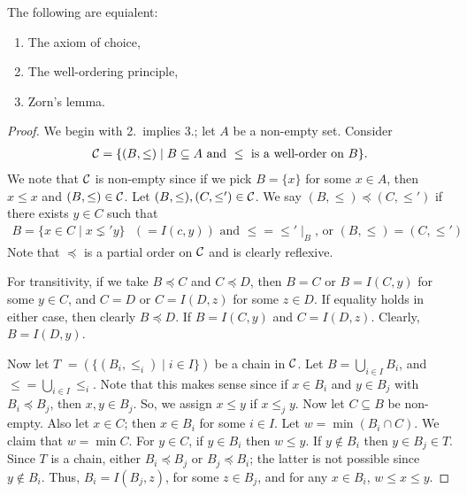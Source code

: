 \begin{theorem}
    The following are equialent:
    \begin{enumerate}
        \item The axiom of choice,
        \item The well-ordering principle,
        \item Zorn's lemma.
    \end{enumerate}
\end{theorem}

\begin{proof}
    We begin with 2.~implies 3.; let $A$ be a non-empty set. Consider 
    \begin{align}
        \mathcal{C} = \{(B,\leq) \mid B \subseteq A \text{ and }\leq \text{ is a well-order on } B\}.
    \end{align}
    We note that $\mathcal{C}$ is non-empty since if we pick $B = \{x\}$ for some $x \in A$, then $x \leq x$ and $(B,\leq) \in \mathcal{C}$. Let $(B,\leq), (C,\leq') \in \mathcal{C}$. We say $(B, \leq) \preceq (C,\leq')$ if there exists $y \in C$ such that 
    \begin{align}
        \text{$B = \{x \in C \mid x \lneq' y\}$ $(=I(c,y))$ and $\leq = \leq'\mid_{B}$, or $(B,\leq) = (C,\leq')$}
    \end{align}
    Note that $\preceq$ is a partial order on $\mathcal{C}$ and is clearly reflexive.
    
    For transitivity, if we take $B \preceq C$ and $C \preceq D$, then $B = C$ or $B = I(C,y)$ for some $y \in C$, and $C = D$ or $C = I(D,z)$ for some $z \in D$. If equality holds in either case, then clearly $B \preceq D$. If $B = I(C,y)$ and $C = I(D,z)$. Clearly, $B = I(D,y)$.
    
    Now let $T$ $=(\{(B_{i},\leq_{i}) \mid i \in I\})$ be a chain in $\mathcal{C}$. Let $B = \bigcup_{i \in I} B_{i}$, and $\leq = \bigcup_{i \in I} \leq_{i}$. Note that this makes sense since if $x \in B_{i}$ and $y \in B_{j}$ with $B_{i} \preceq B_{j}$, then $x,y \in B_{j}$. So, we assign $x \leq y$ if $x \leq_{j} y$. Now let $C \subseteq B$ be non-empty. Also let $x \in C$; then $x \in B_{i}$ for some $i \in I$. Let $w = \min (B_{i} \cap C)$. We claim that $w = \min C$. For $y \in C$, if $y \in B_{i}$ then $w \leq y$. If $y \notin B_{i}$ then $y \in B_{j} \in T$. Since $T$ is a chain, either $B_{i} \preceq B_{j}$ or $B_{j} \preceq B_{i}$; the latter is not possible since $y \notin B_{i}$. Thus, $B_{i} = I(B_{j},z)$, for some $z \in B_{j}$, and for any $x \in B_{i}$, $w \leq x \leq y$. 


\end{proof}
